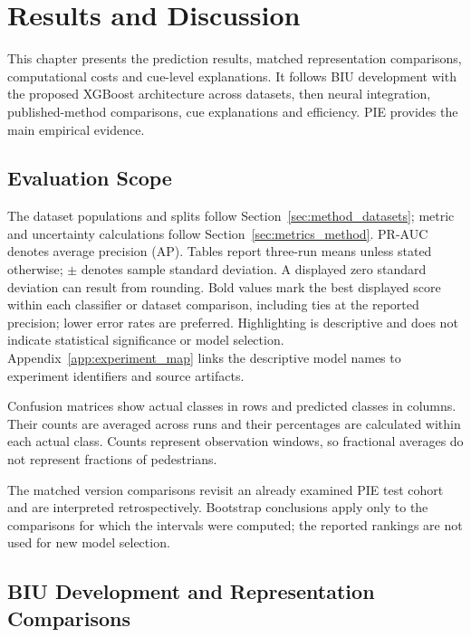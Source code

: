 \clearpage
\chapter{Results and Discussion}\label{chap:results_discussion}

This chapter presents the prediction results, matched representation comparisons,
computational costs and cue-level explanations. It follows BIU development with the
proposed XGBoost architecture across datasets, then neural integration, published-method
comparisons, cue explanations and efficiency. PIE provides the main empirical evidence.

\FloatBarrier
\section{Evaluation Scope}\label{sec:ch4_scope}

The dataset populations and splits follow Section~\ref{sec:method_datasets}; metric
and uncertainty calculations follow Section~\ref{sec:metrics_method}. PR-AUC denotes
average precision (AP). Tables report
three-run means unless stated otherwise; $\pm$ denotes sample standard deviation.
A displayed zero standard deviation can result from rounding.
Bold values mark the best displayed score within each classifier or dataset comparison,
including ties at the reported precision; lower error rates are preferred. Highlighting
is descriptive and does not indicate statistical significance or model selection. Appendix~\ref{app:experiment_map} links the descriptive model names to
experiment identifiers and source artifacts.

Confusion matrices show actual classes in rows and predicted classes in columns.
Their counts are averaged across runs and their percentages are calculated within each
actual class. Counts represent observation windows, so fractional averages do not
represent fractions of pedestrians.

The matched version comparisons revisit an already examined PIE test cohort and are
interpreted retrospectively. Bootstrap conclusions apply only to the comparisons for
which the intervals were computed; the reported rankings are not used for new model
selection.


\FloatBarrier
\section{BIU Development and Representation Comparisons}\label{sec:ch4_initial}

